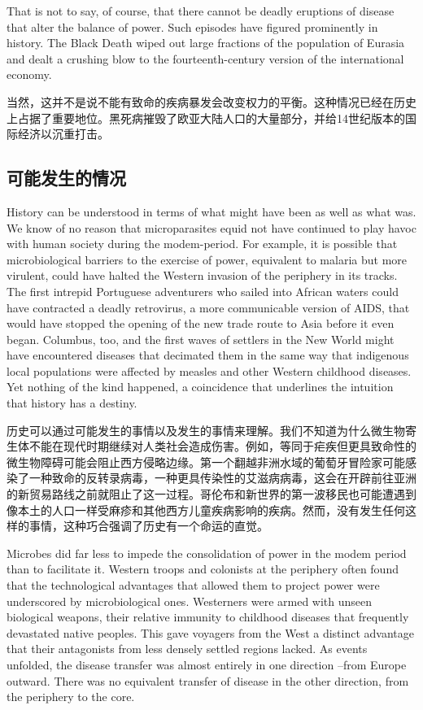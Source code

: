 \begin{Parallel}{97mm}{45mm}
  \ParallelLText
  {That is not to say, of course, that there cannot be deadly eruptions of disease that alter the balance of power. Such episodes have figured prominently in history. The Black Death wiped out large fractions of the population of Eurasia and dealt a crushing blow to the fourteenth-century version of the international economy.}
  
  \ParallelRText
  {当然，这并不是说不能有致命的疾病暴发会改变权力的平衡。这种情况已经在历史上占据了重要地位。黑死病摧毁了欧亚大陆人口的大量部分，并给14世纪版本的国际经济以沉重打击。}
  \ParallelPar

  \subsection{可能发生的情况}

  \ParallelLText
  {History can be understood in terms of what might have been as well as what was. We know of no reason that microparasites equid not have continued to play havoc with human society during the modem-period. For example, it is possible that microbiological barriers to the exercise of power, equivalent to malaria but more virulent, could have halted the Western invasion of the periphery in its tracks. The first intrepid Portuguese adventurers who sailed into African waters could have contracted a deadly retrovirus, a more communicable version of AIDS, that would have stopped the opening of the new trade route to Asia before it even began. Columbus, too, and the first waves of settlers in the New World might have encountered diseases that decimated them in the same way that indigenous local populations were affected by measles and other Western childhood diseases. Yet nothing of the kind happened, a coincidence that underlines the intuition that history has a destiny.}
  
  \ParallelRText
  {历史可以通过可能发生的事情以及发生的事情来理解。我们不知道为什么微生物寄生体不能在现代时期继续对人类社会造成伤害。例如，等同于疟疾但更具致命性的微生物障碍可能会阻止西方侵略边缘。第一个翻越非洲水域的葡萄牙冒险家可能感染了一种致命的反转录病毒，一种更具传染性的艾滋病病毒，这会在开辟前往亚洲的新贸易路线之前就阻止了这一过程。哥伦布和新世界的第一波移民也可能遭遇到像本土的人口一样受麻疹和其他西方儿童疾病影响的疾病。然而，没有发生任何这样的事情，这种巧合强调了历史有一个命运的直觉。}
  \ParallelPar


  \ParallelLText
  {Microbes did far less to impede the consolidation of power in the modem period than to facilitate it. Western troops and colonists at the periphery often found that the technological advantages that allowed them to project power were underscored by microbiological ones. Westerners were armed with unseen biological weapons, their relative immunity to childhood diseases that frequently devastated native peoples. This gave voyagers from the West a distinct advantage that their antagonists from less densely settled regions lacked. As events unfolded, the disease transfer was almost entirely in one direction --from Europe outward. There was no equivalent transfer of disease in the other direction, from the periphery to the core.}
  

\end{Parallel}
